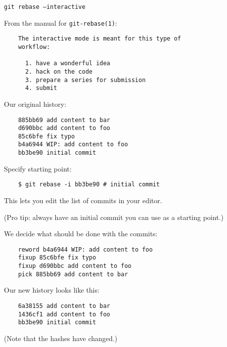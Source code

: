 \documentclass[11pt,xetex]{beamer}
\begin{document}
\begin{frame}{}
  \begin{center}
    \huge \texttt{git rebase --interactive}
  \end{center}
\end{frame}

\begin{frame}[fragile]{}
  \Large From the manual for \texttt{git-rebase(1)}:

  \large
  \begin{verbatim}
    The interactive mode is meant for this type of
    workflow:

      1. have a wonderful idea
      2. hack on the code
      3. prepare a series for submission
      4. submit
  \end{verbatim}
\end{frame}

\begin{frame}[fragile]{}
  \Large
  Our original history:

  \begin{verbatim}
    885bb69 add content to bar
    d690bbc add content to foo
    85c6bfe fix typo
    b4a6944 WIP: add content to foo
    bb3be90 initial commit
  \end{verbatim}
\end{frame}

\begin{frame}[fragile]{}
  \Large
  Specify starting point:

  \begin{verbatim}
    $ git rebase -i bb3be90 # initial commit
  \end{verbatim}
  \pause

  \normalsize
  This lets you edit the list of commits in your editor.
  \pause

  (Pro tip: always have an initial commit you can use as a starting point.)
\end{frame}

\begin{frame}[fragile]{}
  \Large
  We decide what should be done with the commits:

  \begin{verbatim}
    reword b4a6944 WIP: add content to foo
    fixup 85c6bfe fix typo
    fixup d690bbc add content to foo
    pick 885bb69 add content to bar
  \end{verbatim}
\end{frame}

\begin{frame}[fragile]{}
  \Large
  Our new history looks like this:

  \begin{verbatim}
    6a38155 add content to bar
    1436cf1 add content to foo
    bb3be90 initial commit
  \end{verbatim}

  \large
  (Note that the hashes have changed.)

\end{frame}
\end{document}
